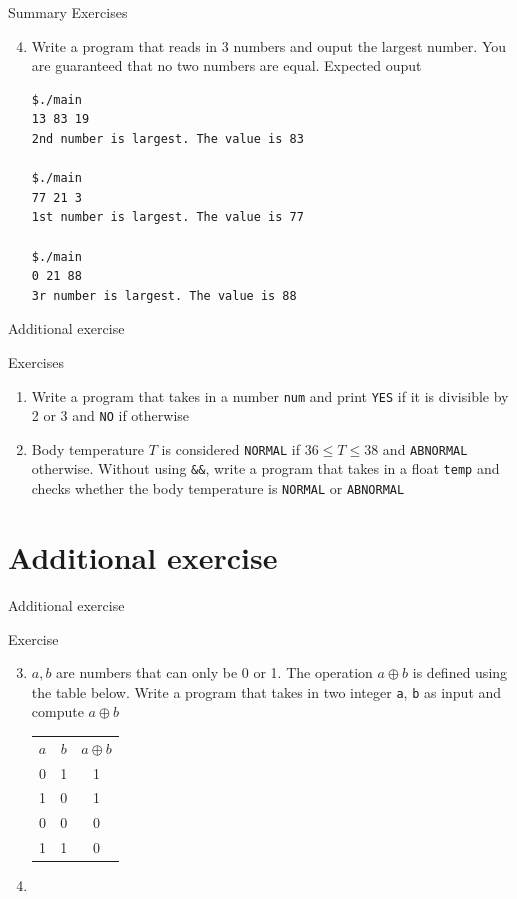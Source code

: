 \documentclass[10pt,xcolor={table,dvipsnames},t]{beamer}
\begin{document}
\begin{frame}[fragile]{Summary Exercises}
  \begin{enumerate}
    \setcounter{enumi}{3}
    \item Write a program that reads in 3 numbers and ouput the largest number. You are guaranteed that no two numbers are equal. Expected ouput
\begin{lstlisting}[language=bash]
$./main
13 83 19
2nd number is largest. The value is 83

$./main
77 21 3
1st number is largest. The value is 77

$./main
0 21 88
3r number is largest. The value is 88
\end{lstlisting}
  \end{enumerate}
\end{frame}


\begin{frame}{Additional exercise}
  \begin{exampleblock}{Exercises}
    \begin{enumerate}
      \item Write a program that takes in a number \texttt{num} and print \texttt{YES} if it is divisible by 2 or 3 and \texttt{NO} if otherwise
      \item Body temperature $T$ is considered \texttt{NORMAL} if $36\leq T \leq 38$ and \texttt{ABNORMAL} otherwise. Without using \texttt{\&\&}, write a program that takes in a float \texttt{temp} and checks whether the body temperature is \texttt{NORMAL} or \texttt{ABNORMAL}
    \end{enumerate}
  \end{exampleblock}
\end{frame}

\section{Additional exercise}
\begin{frame}{Additional exercise}
  \begin{exampleblock}{Exercise}
    \begin{enumerate}
      \setcounter{enumi}{2}
      \item $a,b$ are numbers that can only be 0 or 1. The operation $a \oplus b$ is defined using the table below. Write a program that takes in two integer \texttt{a}, \texttt{b} as input and compute $a\oplus b$
      \begin{table}[]
        \begin{tabular}{ccc}
        $a$ & $b$ & $a\oplus b$ \\
        0   & 1   & 1           \\
        1   & 0   & 1           \\
        0   & 0   & 0           \\
        1   & 1   & 0          
        \end{tabular}
        \end{table}
      \item 
    \end{enumerate}
  \end{exampleblock}
  
\end{frame}
\end{document}
